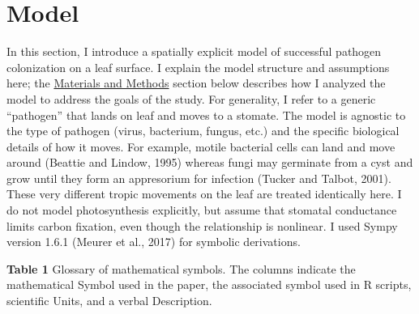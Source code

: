 \documentclass[utf8]{frontiersSCNS}
\begin{document}
\hypertarget{model}{%
\section*{Model}\label{model}}

In this section, I introduce a spatially explicit model of successful
pathogen colonization on a leaf surface. I explain the model structure
and assumptions here; the
\protect\hyperlink{materials-and-methods}{Materials and Methods} section
below describes how I analyzed the model to address the goals of the
study. For generality, I refer to a generic ``pathogen'' that lands on
leaf and moves to a stomate. The model is agnostic to the type of
pathogen (virus, bacterium, fungus, etc.) and the specific biological
details of how it moves. For example, motile bacterial cells can land
and move around (Beattie and Lindow, 1995) whereas fungi may germinate
from a cyst and grow until they form an appresorium for infection
(Tucker and Talbot, 2001). These very different tropic movements on the
leaf are treated identically here. I do not model photosynthesis
explicitly, but assume that stomatal conductance limits carbon fixation,
even though the relationship is nonlinear. I used Sympy version 1.6.1
(Meurer et al., 2017) for symbolic derivations.

\textbf{Table 1} \textbar{} Glossary of mathematical symbols. The
columns indicate the mathematical Symbol used in the paper, the
associated symbol used in R scripts, scientific Units, and a verbal
Description.
\end{document}
